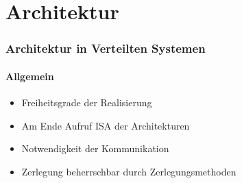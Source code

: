 \section{Architektur}
\begin{frame}
  \frametitle{Architektur in Verteilten Systemen}
  \framesubtitle{Allgemein}
  \begin{itemize}
    \item Freiheitsgrade der Realisierung
    \item Am Ende Aufruf ISA der Architekturen
    \item Notwendigkeit der Kommunikation
    \item Zerlegung beherrschbar durch Zerlegungsmethoden
  \end{itemize}
\end{frame}
